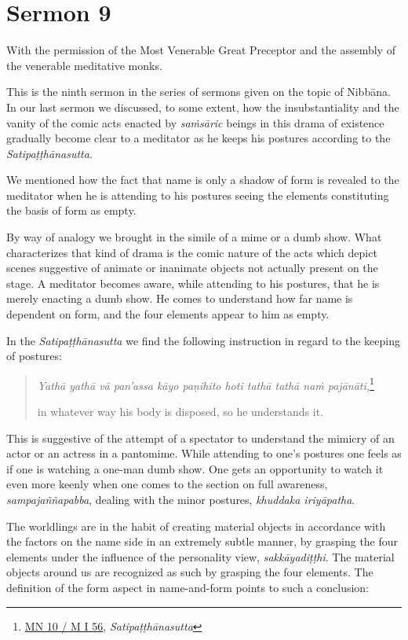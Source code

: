 \chapter{Sermon 9}

\NibbanaOpeningQuote

With the permission of the Most Venerable Great Preceptor and the assembly of the venerable meditative monks.

This is the ninth sermon in the series of sermons given on the topic of Nibbāna. In our last sermon we discussed, to some extent, how the insubstantiality and the vanity of the comic acts enacted by \emph{saṁsāric} beings in this drama of existence gradually become clear to a meditator as he keeps his postures according to the \emph{Satipaṭṭhānasutta}.

We mentioned how the fact that name is only a shadow of form is revealed to the meditator when he is attending to his postures seeing the elements constituting the basis of form as empty.

By way of analogy we brought in the simile of a mime or a dumb show. What characterizes that kind of drama is the comic nature of the acts which depict scenes suggestive of animate or inanimate objects not actually present on the stage. A meditator becomes aware, while attending to his postures, that he is merely enacting a dumb show. He comes to understand how far name is dependent on form, and the four elements appear to him as empty.

In the \emph{Satipaṭṭhānasutta} we find the following instruction in regard to the keeping of postures:

\begin{quote}
\emph{Yathā yathā vā pan'assa kāyo paṇihito hoti tathā tathā naṁ pajānāti,}\footnote{\href{https://suttacentral.net/mn10/pli/ms}{MN 10 / M I 56}, \emph{Satipaṭṭhānasutta}}

in whatever way his body is disposed, so he understands it.
\end{quote}

This is suggestive of the attempt of a spectator to understand the mimicry of an actor or an actress in a pantomime. While attending to one's postures one feels as if one is watching a one-man dumb show. One gets an opportunity to watch it even more keenly when one comes to the section on full awareness, \emph{sampajaññapabba}, dealing with the minor postures, \emph{khuddaka iriyāpatha}.

The worldlings are in the habit of creating material objects in accordance with the factors on the name side in an extremely subtle manner, by grasping the four elements under the influence of the personality view, \emph{sakkāyadiṭṭhi}. The material objects around us are recognized as such by grasping the four elements. The definition of the form aspect in name-and-form points to such a conclusion:

